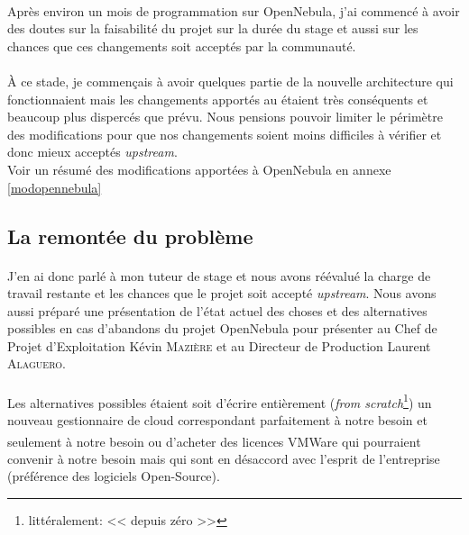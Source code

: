 \paragraph*{}
Après environ un mois de programmation sur OpenNebula, j'ai commencé à avoir des doutes sur la faisabilité du projet sur la durée du stage et
aussi sur les chances que ces changements soit acceptés par la communauté.

\paragraph*{}
À ce stade, je commençais à avoir quelques partie de la nouvelle architecture qui fonctionnaient mais les changements apportés au étaient très
conséquents et beaucoup plus dispercés que prévu. Nous pensions pouvoir limiter le périmètre des modifications pour que nos changements soient
moins difficiles à vérifier et donc mieux acceptés \emph{upstream}.\\
Voir un résumé des modifications apportées à OpenNebula en annexe \ref{modopennebula}

\subsection{La remontée du problème}

\paragraph*{}
J'en ai donc parlé à mon tuteur de stage et nous avons réévalué la charge de travail restante et les chances que le projet soit accepté \emph{upstream}.
Nous avons aussi préparé une présentation de l'état actuel des choses et des alternatives possibles en cas d'abandons du projet OpenNebula pour
présenter au Chef de Projet d'Exploitation Kévin \textsc{Mazière} et au Directeur de Production Laurent \textsc{Alaguero}.

\paragraph*{}
Les alternatives possibles étaient soit d'écrire entièrement (\emph{from scratch}\footnote{littéralement: << depuis zéro >>}) un nouveau gestionnaire de
cloud correspondant parfaitement à notre besoin et seulement à notre besoin ou d'acheter des licences VMWare\textsuperscript{\textregistered} qui pourraient
convenir à notre besoin mais qui sont en désaccord avec l'esprit de l'entreprise (préférence des logiciels Open-Source).

